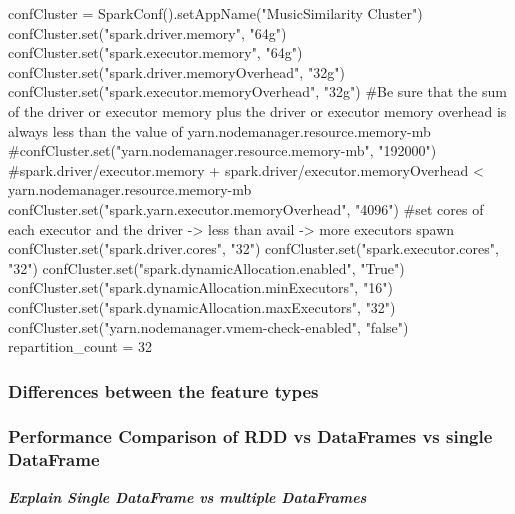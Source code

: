 \begin{pythonCode}
confCluster = SparkConf().setAppName("MusicSimilarity Cluster")
confCluster.set("spark.driver.memory", "64g")
confCluster.set("spark.executor.memory", "64g")
confCluster.set("spark.driver.memoryOverhead", "32g")
confCluster.set("spark.executor.memoryOverhead", "32g")
#Be sure that the sum of the driver or executor memory plus the driver or executor memory overhead is always less than the value of yarn.nodemanager.resource.memory-mb
#confCluster.set("yarn.nodemanager.resource.memory-mb", "192000")
#spark.driver/executor.memory + spark.driver/executor.memoryOverhead < yarn.nodemanager.resource.memory-mb
confCluster.set("spark.yarn.executor.memoryOverhead", "4096")
#set cores of each executor and the driver -> less than avail -> more executors spawn
confCluster.set("spark.driver.cores", "32")
confCluster.set("spark.executor.cores", "32")
confCluster.set("spark.dynamicAllocation.enabled", "True")
confCluster.set("spark.dynamicAllocation.minExecutors", "16")
confCluster.set("spark.dynamicAllocation.maxExecutors", "32")
confCluster.set("yarn.nodemanager.vmem-check-enabled", "false")
repartition_count = 32
\end{pythonCode}

\subsubsection{Differences between the feature types}


\subsubsection{Performance Comparison of RDD vs DataFrames vs single DataFrame}

\noindent\textbf{\textit{Explain Single DataFrame vs multiple DataFrames}}

